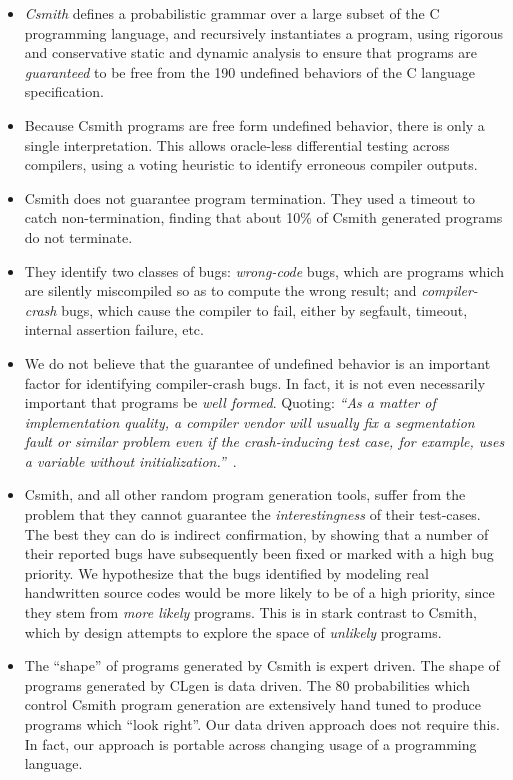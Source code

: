 \begin{itemize}
	\item \emph{Csmith} defines a probabilistic grammar over a large subset of the C programming language, and recursively instantiates a program, using rigorous and conservative static and dynamic analysis to ensure that programs are \emph{guaranteed} to be free from the 190 undefined behaviors of the C language specification.
	\item Because Csmith programs are free form undefined behavior, there is only a single interpretation. This allows oracle-less differential testing across compilers, using a voting heuristic to identify erroneous compiler outputs.
	\item Csmith does not guarantee program termination. They used a timeout to catch non-termination, finding that about 10\% of Csmith generated programs do not terminate.
	\item They identify two classes of bugs: \emph{wrong-code} bugs, which are programs which are silently miscompiled so as to compute the wrong result; and \emph{compiler-crash} bugs, which cause the compiler to fail, either by segfault, timeout, internal assertion failure, etc.
	\item We do not believe that the guarantee of undefined behavior is an important factor for identifying compiler-crash bugs. In fact, it is not even necessarily important that programs be \emph{well formed}. Quoting: 
	\emph{``As a matter of implementation quality, a compiler vendor will usually fix a segmentation fault or similar problem even if the crash-inducing test case, for example, uses a variable without initialization.''}~\cite{Regehr2012a}.
	\item Csmith, and all other random program generation tools, suffer from the problem that they cannot guarantee the \emph{interestingness} of their test-cases. The best they can do is indirect confirmation, by showing that a number of their reported bugs have subsequently been fixed or marked with a high bug priority. We hypothesize that the bugs identified by modeling real handwritten source codes would be more likely to be of a high priority, since they stem from \emph{more likely} programs. This is in stark contrast to Csmith, which by design attempts to explore the space of \emph{unlikely} programs.
	\item The ``shape'' of programs generated by Csmith is expert driven. The shape of programs generated by CLgen is data driven. The 80 probabilities which control Csmith program generation are extensively hand tuned to produce programs which ``look right''. Our data driven approach does not require this. In fact, our approach is portable across changing usage of a programming language.

\end{itemize}
